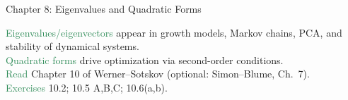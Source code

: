 \documentclass[11pt,aspectratio=169]{beamer}
\begin{document}
\begin{frame}{Chapter 8: Eigenvalues and Quadratic Forms}
 
\textcolor{SeaGreen}{Eigenvalues/eigenvectors} appear in growth models, Markov chains, PCA, and stability of dynamical systems.\\[4mm]
\textcolor{SeaGreen}{Quadratic forms} drive optimization via second-order conditions.\\[4mm]

\textcolor{SeaGreen}{Read} Chapter 10 of Werner--Sotskov (optional: Simon--Blume, Ch.~7). \\[4mm]
\textcolor{SeaGreen}{Exercises} 10.2; 10.5 A,B,C; 10.6(a,b). 
\end{frame}
\end{document}
